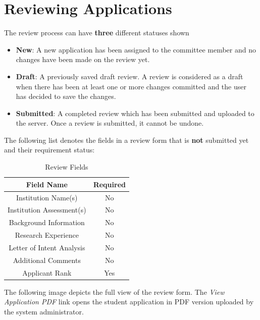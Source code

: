 \documentclass[fontsize=12pt,paper=letter,twoside]{scrartcl}
\begin{document}
\clearpage
\newpage
\section{Reviewing Applications} \label{sec:reviews}
The review process can have \textbf{three} different statuses shown
\begin{itemize}
\item \textbf{New}: A new application has been assigned to the committee member and no changes have been made on the review yet.
\item \textbf{Draft}: A previously saved draft review. A review is considered as a draft when there has been at least one or more changes committed and the user has decided to save the changes.
\item \textbf{Submitted}: A completed review which has been submitted and uploaded to the server. Once a review is submitted, it cannot be undone.
\end{itemize}

\bigskip
\noindent The following list denotes the fields in a review form that is \textbf{not} submitted yet and their requirement status:
\begin{table}[h]
\centering
\begin{tabular}{|c | c |}
	\cline{1-2}
	\textbf{Field Name} & \textbf{Required}\\ \hline
	Institution Name(s) & No \\ \hline
	Institution Assessment(s) & No \\ \hline
	Background Information & No \\ \hline
	Research Experience & No \\ \hline
	Letter of Intent Analysis & No \\ \hline
	Additional Comments & No \\ \hline
	Applicant Rank & Yes \\ \hline
\end{tabular}
\caption {Review Fields}
\label{tbl:review_fields}
\end{table}

\newpage
\bigskip
\noindent The following image depicts the full view of the review form. The \emph{View Application PDF} link opens the student application in PDF version uploaded by the system administrator. 
\end{document}

